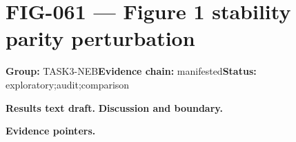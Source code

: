 \clearpage
\section{FIG-061 --- Figure 1 stability parity perturbation}
\label{figpage:fig-061}
\textbf{Group:} TASK3-NEB\quad \textbf{Evidence chain:} manifested\quad \textbf{Status:} exploratory;audit;comparison

\textbf{Results text draft.} 
\textbf{Discussion and boundary.} 


\textbf{Evidence pointers.}



\vfill
